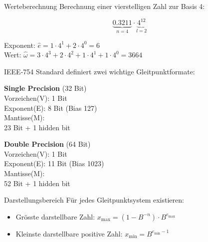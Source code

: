 \begin{example2}{Werteberechnung} Berechnung einer vierstelligen Zahl zur Basis 4:
    \vspace{-2mm}\\
    \begin{minipage}{0.3\textwidth}
        $$\underbrace{0.3211}_{n=4} \cdot \underbrace{4^{12}}_{l=2}$$
    \end{minipage}
    \begin{minipage}[t]{0.65\textwidth}
        Exponent: $\hat{e} = 1 \cdot 4^1 + 2 \cdot 4^0 = 6$ \vspace{1mm}\\
        Wert: $\hat{\omega} = 3 \cdot 4^3 + 2 \cdot 4^2 + 1 \cdot 4^1 + 1 \cdot 4^0 = 3664$
    \end{minipage}
\end{example2}



\begin{concept}{IEEE-754 Standard} definiert zwei wichtige Gleitpunktformate:
\vspace{1mm}\\
\begin{minipage}[t]{0.5\textwidth}
    \textbf{Single Precision} (32 Bit)\\
    Vorzeichen(V): 1 Bit\\
    Exponent(E): 8 Bit (Bias 127)\\
    Mantisse(M): \\ 23 Bit + 1 hidden bit
\end{minipage}
\begin{minipage}[t]{0.48\textwidth}
    \textbf{Double Precision} (64 Bit)\\
    Vorzeichen(V): 1 Bit\\
    Exponent(E): 11 Bit (Bias 1023)\\
    Mantisse(M): \\ 52 Bit + 1 hidden bit
\end{minipage}
\end{concept}

\begin{theorem}{Darstellungsbereich}
Für jedes Gleitpunktsystem existieren:
\begin{itemize}
    \item Grösste darstellbare Zahl: \large{$x_{\text{max}} = (1-B^{-n}) \cdot B^{e_{\text{max}}}$}
    \item \normalsize{Kleinste darstellbare positive Zahl:} \large{$x_{\text{min}} = B^{e_{\text{min}}-1}$}
\end{itemize}
\end{theorem}

